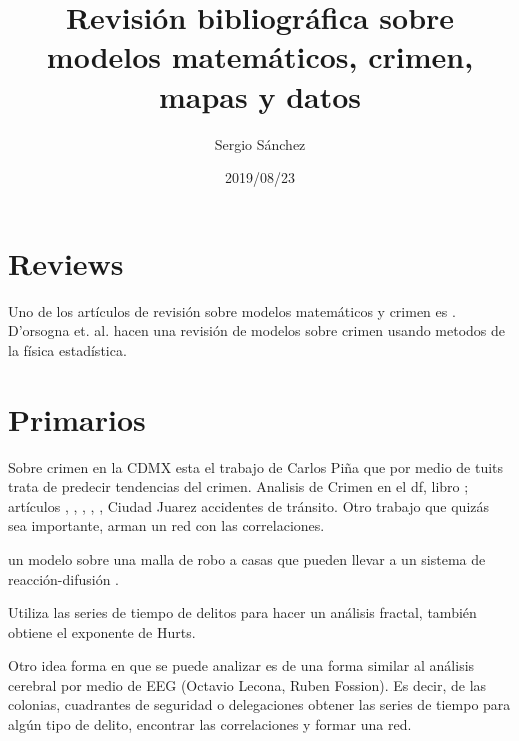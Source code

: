 \documentclass[onecolumn,12pt,letterpaper]{article}
\title{Revisión bibliográfica sobre modelos matemáticos, crimen, mapas y datos}
\author{Sergio Sánchez}
\date{2019/08/23}
\begin{document}
\maketitle

\section{Reviews}

Uno de los artículos de revisión sobre modelos matemáticos y crimen es \cite{gordon_random_2010}. D'orsogna et. al.\cite{dorsogna_statistical_2015} hacen una revisión de modelos sobre crimen usando metodos de la física estadística.

\section{Primarios}



Sobre crimen en la CDMX esta el trabajo de Carlos Piña\cite{pina-garcia_exploring_2019} que por medio de tuits trata de predecir tendencias del crimen. Analisis de Crimen en el df, libro \cite{mendoza_tamano_2012}; artículos \cite{mata_mobile_2016}, \cite{vilalta_what_2016}, \cite{sanchez_salinas_robo_2016}, \cite{fuentes_flores_distribucion_2017}, \cite{cisneros_geografimiedo_2008}, Ciudad Juarez accidentes de tránsito\cite{hernandez_hernandez_alisis_2012}. Otro trabajo que quizás sea importante\cite{espinal-enriquez_analysis_2015}, arman un red con las correlaciones. \cite{noauthor_delincuencia_nodate}
\cite{noauthor_crimen_nodate} \cite{noauthor_robo_nodate} \cite{noauthor_homicidios_nodate} \cite{noauthor_visualizar_nodate} \cite{que_nodate} \cite{infodatacivica.org_explorador_nodate} \cite{robo_nodate}


un modelo sobre una malla de robo a casas que pueden llevar a un sistema de reacción-difusión \cite{short_statistical_2008}.


Utiliza las series de tiempo de delitos para hacer un análisis fractal, también obtiene el exponente de Hurts\cite{melgarejo_multifractal_2017}.  

Otro idea forma en que se puede analizar es de una forma similar al análisis cerebral por medio de EEG (Octavio Lecona, Ruben Fossion). Es decir, de las colonias, cuadrantes de seguridad o delegaciones obtener las series de tiempo para algún tipo de delito, encontrar las correlaciones y formar una red. 


\end{document}
